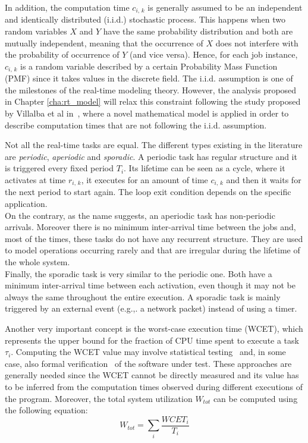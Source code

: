 In addition, the computation time \( c_{i,\,k} \) is generally assumed to be an
independent and identically distributed (i.i.d.) stochastic process.
This happens when two random variables \( X \) and \( Y \) have 
the same probability distribution and both are mutually
independent, meaning that the occurrence of \( X \) does not interfere with 
the probability of occurrence of \( Y \) (and vice versa).
Hence, for each job instance, \( c_{i,\,k} \) is a random
variable described by a certain Probability Mass Function (PMF) since it
takes values in the discrete field.
The i.i.d. assumption is one of the milestones of the real-time modeling theory.
However, the analysis proposed in Chapter \ref{cha:rt_model} will relax this 
constraint following the study proposed by Villalba et al
in~\cite{villalba2017probabilistic}, where a novel mathematical model is applied
in order to describe computation times that are not following the i.i.d.
assumption.

Not all the real-time tasks are equal. The different types existing in
the literature are \emph{periodic}, \emph{aperiodic} and \emph{sporadic}.
A periodic task has regular structure
and it is triggered every fixed period \( T_{i} \). Its lifetime can be seen as
a cycle, where it activates at time \( r_{i,\,k} \), it executes for an amount 
of time \( c_{i,\,k} \) and then it waits for the next period to start again.
The loop exit condition depends on the specific application.\\
On the contrary, as the name suggests, an aperiodic task has non-periodic arrivals.
Moreover there is no minimum inter-arrival time between the jobs and,
most of the times, these tasks do not have any recurrent structure. They are used
to model operations occurring rarely and that are irregular during the lifetime
of the whole system.\\
Finally, the sporadic task is very similar to the periodic one. Both have a minimum
inter-arrival time between each activation, even though it may not be always the
same throughout the entire execution. A sporadic task is mainly triggered by an
external event (e.g.,. a network packet) instead of using a timer.

Another very important concept is the worst-case execution time (WCET), which
represents the upper bound for the fraction of CPU time spent to execute a task
\( \tau_{i} \). Computing the WCET value may involve statistical testing~\cite{bernat2002wcet}
and, in some case, also formal verification~\cite{souyris2009formal} of the
software under test. These approaches are generally needed since the WCET cannot
be directly measured and its value has to be inferred from the computation times
observed during different executions of the program.
Moreover, the total system utilization \( W_{tot} \) can be computed using
the following equation:
\begin{equation}\label{eq:system_utilization}
    W_{tot} = \displaystyle\sum_{i} \frac{WCET_i}{T_i}
\end{equation}

